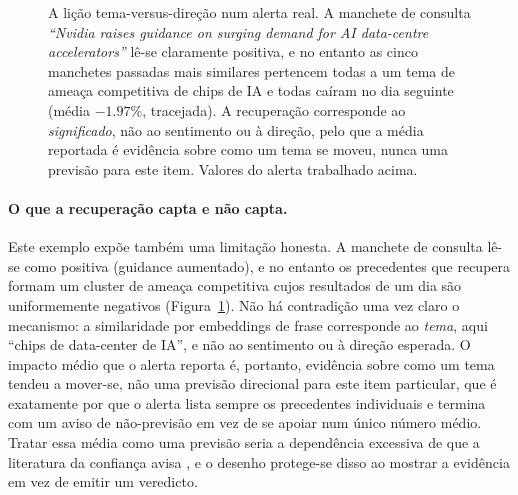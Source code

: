 \begin{figure}[ht]
\centering
{}
\caption[Mesmo tema, direção oposta]{A lição tema-versus-direção num alerta real. A manchete de consulta
\emph{``Nvidia raises guidance on surging demand for AI data-centre accelerators''} lê-se claramente positiva,
e no entanto as cinco manchetes passadas mais similares pertencem todas a um tema de ameaça competitiva de
chips de IA e todas caíram no dia seguinte (média $-1.97\%$, tracejada). A recuperação corresponde ao
\emph{significado}, não ao sentimento ou à direção, pelo que a média reportada é evidência sobre como um tema se
moveu, nunca uma previsão para este item. Valores do alerta trabalhado acima.}
\label{fig:theme_direction}
\end{figure}

\paragraph{O que a recuperação capta e não capta.}
Este exemplo expõe também uma limitação honesta. A manchete de consulta lê-se como positiva (guidance
aumentado), e no entanto os precedentes que recupera formam um cluster de ameaça competitiva cujos resultados
de um dia são uniformemente negativos (Figura~\ref{fig:theme_direction}). Não há contradição uma vez claro o
mecanismo: a similaridade por embeddings de frase corresponde ao \emph{tema}, aqui ``chips de data-center de
IA'', e não ao sentimento ou à direção esperada. O impacto médio que o alerta reporta é, portanto, evidência
sobre como um tema tendeu a mover-se, não uma previsão direcional para este item particular, que é exatamente
por que o alerta lista sempre os precedentes individuais e termina com um aviso de não-previsão em vez de se
apoiar num único número médio. Tratar essa média como uma previsão seria a dependência excessiva de que a
literatura da confiança avisa \autocite{lee2004trust, bansal2021whole}, e o desenho protege-se disso ao mostrar
a evidência em vez de emitir um veredicto.

